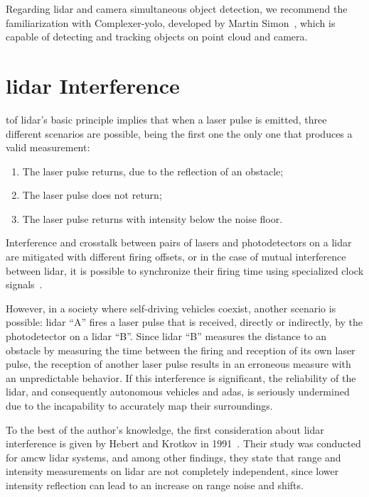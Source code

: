 Regarding \ac{lidar} and camera simultaneous object detection, we recommend the familiarization with Complexer-\ac{yolo}, developed by Martin Simon\etal~\cite{Simon2019}, which is capable of detecting and tracking objects on point cloud and camera.


\section{\acs{lidar} Interference}
\label{sec:sota:lidar-interference}
\ac{tof} \ac{lidar}'s basic principle implies that when a \ac{laser} pulse is emitted, three different scenarios are possible, being the first one the only one that produces a valid measurement:

\begin{enumerate}
\item The \ac{laser} pulse returns, due to the reflection of an obstacle;
\item The \ac{laser} pulse does not return;
\item The \ac{laser} pulse returns with intensity below the noise floor.
\end{enumerate}

Interference and crosstalk between pairs of \acp{laser} and photodetectors on a \ac{lidar} are mitigated with different firing offsets, or in the case of mutual interference between \ac{lidar}, it is possible to synchronize their firing time using specialized clock signals~\cite{VLP16}.

However, in a society where self-driving vehicles coexist, another scenario is possible: \ac{lidar} ``A'' fires a \ac{laser} pulse that is received, directly or indirectly, by the photodetector on a \ac{lidar} ``B''. Since \ac{lidar} ``B'' measures the distance to an obstacle by measuring the time between the firing and reception of its own \ac{laser} pulse, the reception of another \ac{laser} pulse results in an erroneous measure with an unpredictable behavior. If this interference is significant, the reliability of the \ac{lidar}, and consequently autonomous vehicles and \ac{adas}, is seriously undermined due to the incapability to accurately map their surroundings.



To the best of the author's knowledge, the first consideration about \ac{lidar} interference is given by Hebert and Krotkov in 1991~\cite{Hebert}. Their study was conducted for \ac{amcw} \ac{lidar} systems, and among other findings, they state that range and intensity measurements on \ac{lidar} are not completely independent, since lower intensity reflection can lead to an increase on range noise and shifts. 

